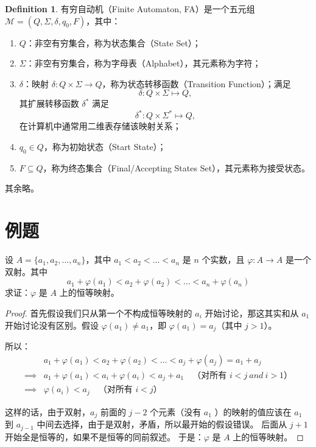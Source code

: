 \documentclass[oneside]{book}
\theoremstyle{definition}
\newtheorem{definition}{Definition}[section]
\begin{document}
\begin{definition}
	有穷自动机（Finite Automaton, FA）是一个五元组 \( \mathcal{M} = (Q, \varSigma, \delta, q_0, F) \)，其中：
	\begin{enumerate}
		\item \( Q \)：非空有穷集合，称为状态集合（State Set）；
		\item \( \varSigma \)：非空有穷集合，称为字母表（Alphabet），其元素称为字符；
		\item \( \delta \)：映射 \( \delta: Q \times \varSigma \to Q \)，称为状态转移函数（Transition Function）；满足
		\[
		\delta: Q \times \Sigma \mapsto Q,
		\]
		其扩展转移函数 \( \delta^* \) 满足
		\[
		\delta^*: Q \times \Sigma^* \mapsto Q,
		\]在计算机中通常用二维表存储该映射关系；
		\item \( q_0 \in Q \)，称为初始状态（Start State）；
		\item \( F \subseteq Q \)，称为终态集合（Final/Accepting States Set），其元素称为接受状态。
	\end{enumerate}
	其余略。
\end{definition}

		\section{例题}
		
		设 \( A = \{ a_1, a_2, \dots, a_n \} \)，其中 \( a_1 < a_2 < \dots < a_n \) 是 \( n \) 个实数，且 \( \varphi: A \to A \) 是一个双射。其中\[
		a_1 + \varphi(a_1) < a_2 + \varphi(a_2) < \dots < a_n + \varphi(a_n)
		\]求证：\( \varphi	\) 是 \( A\) 上的恒等映射。
		\begin{proof}
			
			首先假设我们只从第一个不构成恒等映射的 \(a_i\) 开始讨论，那这其实和从 \( a_1\) 开始讨论没有区别。假设 \( \varphi(a_1) \neq a_1 \)，即 \( \varphi(a_1) = a_j \)（其中 \( j > 1 \)）。
			
			所以：
			\[
			\begin{aligned}
				& a_1 + \varphi(a_1) < a_2 + \varphi(a_2) < \dots < a_j + \varphi(a_j) = a_1 + a_j \\
				\implies &a_1+\varphi(a_1) < a_i + \varphi(a_i) < a_j + a_1 \quad \text{（对所有 } i < j\ and\ i>1 \text{）} \\
				\implies & \varphi(a_i) < a_j \quad \text{（对所有 } i < j \text{）}
			\end{aligned}
			\]
			
			这样的话，由于双射，\( a_j \) 前面的 \( j-2 \) 个元素（没有 \(a_1\) ）的映射的值应该在 \(a_1\) 到 \( a_{j-1}\) 中间去选择，由于是双射，矛盾，所以最开始的假设错误。
			后面从 \( j+1\) 开始全是恒等的，如果不是恒等的同前叙述。
			于是：\( \varphi	\) 是 \( A\) 上的恒等映射。
		\end{proof}
		
\end{document}
